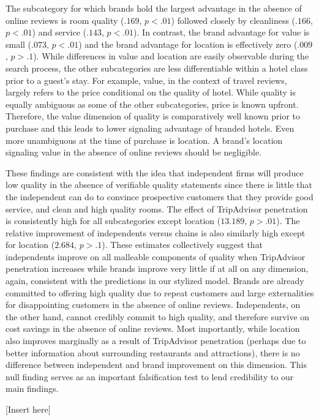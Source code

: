 \documentclass[mksc,blindrev]{informs3} %
\begin{document}
The subcategory for which brands hold the largest advantage in the absence of online reviews is room quality ($.169$, $p<.01$) followed closely by cleanliness ($.166$, $p<.01$) and service ($.143$, $p<.01$). In contrast, the brand advantage for value is small ($.073$, $p<.01$) and the brand advantage for location is effectively zero ($.009$, $p>.1$). While differences in value and location are easily observable during the search process, the other subcategories are less differentiable within a hotel class prior to a guest's stay. For example, value, in the context of travel reviews, largely refers to the price conditional on the quality of hotel. While quality is equally ambiguous as some of the other subcategories, price is known upfront. Therefore, the value dimension of quality is comparatively well known prior to purchase and this leads to lower signaling advantage of branded hotels. Even more unambiguous at the time of purchase is location. A brand's location signaling value in the absence of online reviews should be negligible.

These findings are consistent with the idea that independent firms will produce low quality in the absence of verifiable quality statements since there is little that the independent can do to convince prospective customers that they provide good service, and clean and high quality rooms. The effect of TripAdvisor penetration is consistently high for all subcategories except location ($13.189$, $p>.01$). The relative improvement of independents versus chains is also similarly high except for location ($2.684$, $p>.1$). These estimates collectively suggest that independents improve on all malleable components of quality when TripAdvisor penetration increases while brands improve very little if at all on any dimension, again, consistent with the predictions in our stylized model. Brands are already committed to offering high quality due to repeat customers and large externalities for disappointing customers in the absence of online reviews. Independents, on the other hand, cannot credibly commit to high quality, and therefore survive on cost savings in the absence of online reviews. Most importantly, while location also improves marginally as a result of TripAdvisor penetration (perhaps due to better information about surrounding restaurants and attractions), there is no difference between independent and brand improvement on this dimension. This null finding serves as an important falsification test to lend credibility to our main findings.

[Insert  here]
\end{document}
